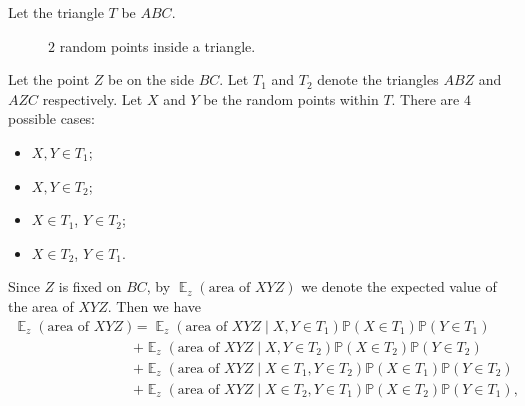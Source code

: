 \documentclass{article}
\DeclareMathOperator{\E}{\mathbb{E}}
\renewcommand{\P}{\mathbb{P}}
\begin{document}
Let the triangle $T$ be $ABC$.
\begin{figure}[h!]
    \centering
    \caption{$2$ random points inside a triangle.}
\end{figure}
Let the point $Z$ be on the side $BC$.
Let $T_{1}$ and $T_{2}$ denote the triangles $ABZ$ and $AZC$ respectively.
Let $X$ and $Y$ be the random points within $T$.
There are $4$ possible cases:
\begin{itemize}
    \item $X, Y \in T_{1}$;
    \item $X, Y \in T_{2}$;
    \item $X\in T_{1}$, $Y\in T_{2}$;
    \item $X\in T_{2}$, $Y\in T_{1}$.
\end{itemize}
Since $Z$ is fixed on $BC$, by $\E_{z}(\text{area of }XYZ)$ we denote the expected value of the area of $XYZ$.
Then we have
\begin{equation}
    \begin{split}
        \E_{z}(\text{area of }XYZ) &= \E_{z}(\text{area of }XYZ\mid X, Y \in T_{1})\P(X\in T_{1})\P(Y\in T_{1})
        \\
        &+ \E_{z}(\text{area of }XYZ\mid X, Y \in T_{2})\P(X\in T_{2})\P(Y\in T_{2})
        \\
        &+ \E_{z}(\text{area of }XYZ\mid X \in T_{1}, Y \in T_{2})\P(X\in T_{1})\P(Y\in T_{2})
        \\
        &+ \E_{z}(\text{area of }XYZ\mid X \in T_{2}, Y \in T_{1})\P(X\in T_{2})\P(Y\in T_{1}),
    \end{split}
\end{equation}
\end{document}
